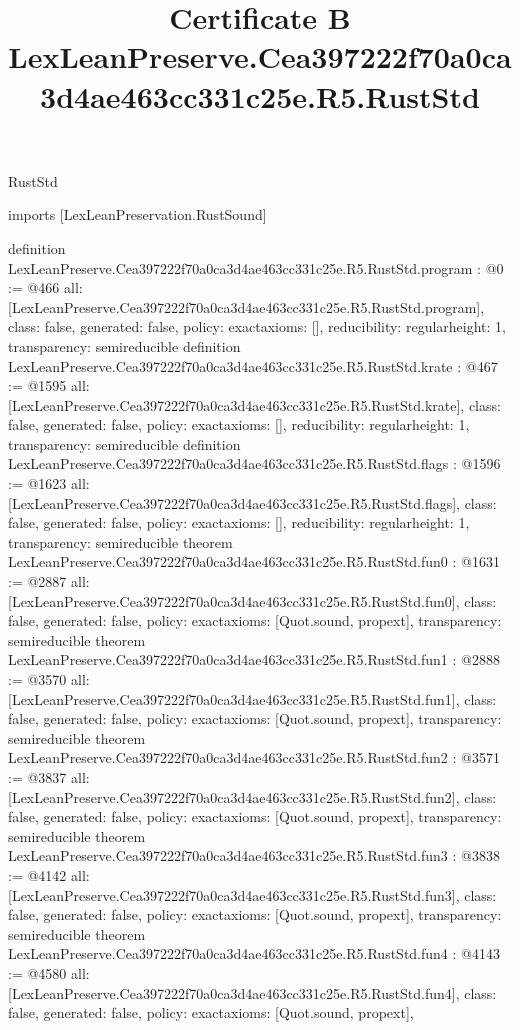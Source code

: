 \begin{lexlean}{RustStd}
\title{Certificate B LexLeanPreserve.Cea397222f70a0ca3d4ae463cc331c25e.R5.RustStd}
\begin{coremodule}
imports [LexLeanPreservation.RustSound]

definition LexLeanPreserve.Cea397222f70a0ca3d4ae463cc331c25e.R5.RustStd.program : @0 := @466 {
  all: [LexLeanPreserve.Cea397222f70a0ca3d4ae463cc331c25e.R5.RustStd.program],
  class: false,
  generated: false,
  policy: exact{axioms: []},
  reducibility: regular{height: 1},
  transparency: semireducible
}
definition LexLeanPreserve.Cea397222f70a0ca3d4ae463cc331c25e.R5.RustStd.krate : @467 := @1595 {
  all: [LexLeanPreserve.Cea397222f70a0ca3d4ae463cc331c25e.R5.RustStd.krate],
  class: false,
  generated: false,
  policy: exact{axioms: []},
  reducibility: regular{height: 1},
  transparency: semireducible
}
definition LexLeanPreserve.Cea397222f70a0ca3d4ae463cc331c25e.R5.RustStd.flags : @1596 := @1623 {
  all: [LexLeanPreserve.Cea397222f70a0ca3d4ae463cc331c25e.R5.RustStd.flags],
  class: false,
  generated: false,
  policy: exact{axioms: []},
  reducibility: regular{height: 1},
  transparency: semireducible
}
theorem LexLeanPreserve.Cea397222f70a0ca3d4ae463cc331c25e.R5.RustStd.fun0 : @1631 := @2887 {
  all: [LexLeanPreserve.Cea397222f70a0ca3d4ae463cc331c25e.R5.RustStd.fun0],
  class: false,
  generated: false,
  policy: exact{axioms: [Quot.sound, propext]},
  transparency: semireducible
}
theorem LexLeanPreserve.Cea397222f70a0ca3d4ae463cc331c25e.R5.RustStd.fun1 : @2888 := @3570 {
  all: [LexLeanPreserve.Cea397222f70a0ca3d4ae463cc331c25e.R5.RustStd.fun1],
  class: false,
  generated: false,
  policy: exact{axioms: [Quot.sound, propext]},
  transparency: semireducible
}
theorem LexLeanPreserve.Cea397222f70a0ca3d4ae463cc331c25e.R5.RustStd.fun2 : @3571 := @3837 {
  all: [LexLeanPreserve.Cea397222f70a0ca3d4ae463cc331c25e.R5.RustStd.fun2],
  class: false,
  generated: false,
  policy: exact{axioms: [Quot.sound, propext]},
  transparency: semireducible
}
theorem LexLeanPreserve.Cea397222f70a0ca3d4ae463cc331c25e.R5.RustStd.fun3 : @3838 := @4142 {
  all: [LexLeanPreserve.Cea397222f70a0ca3d4ae463cc331c25e.R5.RustStd.fun3],
  class: false,
  generated: false,
  policy: exact{axioms: [Quot.sound, propext]},
  transparency: semireducible
}
theorem LexLeanPreserve.Cea397222f70a0ca3d4ae463cc331c25e.R5.RustStd.fun4 : @4143 := @4580 {
  all: [LexLeanPreserve.Cea397222f70a0ca3d4ae463cc331c25e.R5.RustStd.fun4],
  class: false,
  generated: false,
  policy: exact{axioms: [Quot.sound, propext]},
}
\end{coremodule}
\end{lexlean}
